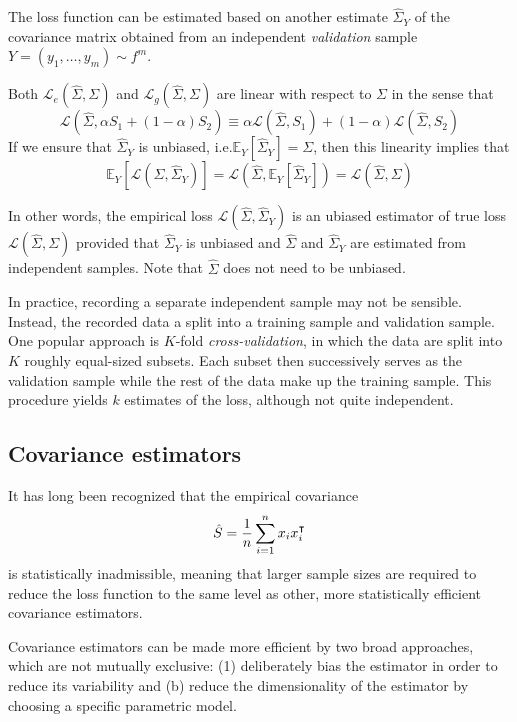 The loss function can be estimated based on another estimate $\hat\Sigma_Y$ of the covariance matrix obtained from an independent \emph{validation} sample $Y = (y_1,\ldots,y_m)\sim f^m$.  

Both $\mathcal L_e(\hat\Sigma,\Sigma)$ and $\mathcal L_g(\hat\Sigma,\Sigma)$ are linear with respect to $\Sigma$ in the sense that
\begin{equation}
\mathcal L\left(\hat \Sigma,\alpha S_1 + (1-\alpha)S_2\right) 
\equiv 
\alpha\mathcal L(\hat\Sigma,S_1) + (1-\alpha)\mathcal L(\hat\Sigma,S_2)
\end{equation}
If we ensure that  $\hat\Sigma_Y$ is unbiased, i.e.\;$\mathbb E_Y\left[\hat \Sigma_Y\right]=\Sigma$, then this linearity implies that 
\begin{equation}
\mathbb E_Y \left[\mathcal L(\hat\Sigma,\hat\Sigma_Y)\right]
=
\mathcal L\left(\hat\Sigma,\mathbb E_Y \left[\hat\Sigma_Y\right]\right)
= 
\mathcal L(\hat\Sigma,\Sigma)
\end{equation}

In other words, the empirical loss $\mathcal L(\hat\Sigma,\hat\Sigma_Y)$ is an ubiased estimator of true loss $\mathcal L(\hat\Sigma,\Sigma)$ provided that $\hat\Sigma_Y$ is unbiased and $\hat\Sigma$ and $\hat\Sigma_Y$ are estimated from independent samples.  Note that $\hat\Sigma$ does not need to be unbiased.  

In practice, recording a separate independent sample may not be sensible.  Instead, the recorded data a split into a training sample and validation sample.  One popular approach is $K$-fold \emph{cross-validation}, in which the data are split into $K$ roughly equal-sized subsets.  Each subset then successively serves as the validation  sample while the rest of the data make up the training sample. This procedure yields $k$ estimates of the loss, although not quite independent. 
 
\subsection*{Covariance estimators}
It has long been recognized that the empirical covariance 
\begin{equation}
\hat S = \frac 1 n \sum\limits_{i=1}^n x_i x_i^\intercal
\end{equation}
is statistically inadmissible, meaning that larger sample sizes are required to reduce the loss function to the same level as other, more statistically efficient covariance estimators.

Covariance estimators can be made more efficient by two broad approaches, which are not mutually exclusive: (1) deliberately bias the estimator in order to reduce its variability and (b) reduce the dimensionality of the estimator by choosing a specific parametric model. 

